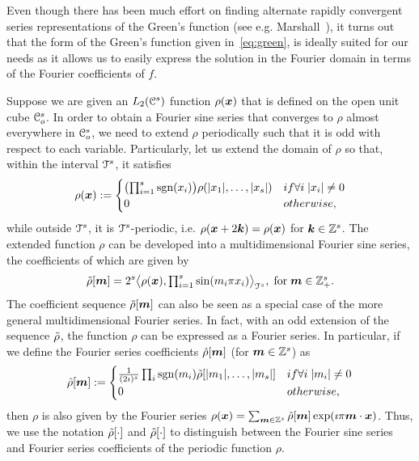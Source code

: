 Even though there has been much effort on finding alternate rapidly
convergent series representations of the Green's function (see
e.g. Marshall~\cite{marshall99}), it turns out that the form of the
Green's function given in~\eqref{eq:green}, is ideally suited
for our needs as it allows us to easily express the solution in the
Fourier domain in terms of the Fourier coefficients of $f$.

Suppose we are given an $L_2(\mathcal{C}^s)$ function $\rho(
\boldsymbol{x})$ that is
defined on the open unit cube $\mathcal{C}_o^s$. In order to obtain a
Fourier sine series that converges to $\rho$ almost everywhere in
$\mathcal{C}_o^s$, we need to extend $\rho$ periodically such that it is odd
with respect to each variable. Particularly, let us extend the domain
of $\rho$ so that, within the interval $\mathcal{T}^s$, it satisfies
\begin{equation}
  \small{
 \rho(\vect{x}) :=  
\begin{cases}
\bigl( \prod_{i=1}^s \sgn(x_i) \bigr)
\rho(|x_1|, \ldots, |x_s| ) &\mbox{if } \forall i \; |x_i| \ne 0 \\ 
0 &\mbox{otherwise},
\end{cases}
}
\label{eq:oddextension}
\end{equation}
while outside $\mathcal{T}^s$, it is $\mathcal{T}^s$-periodic, i.e. $\rho(\boldsymbol{x}
+ 2\boldsymbol{k}) = \rho(\boldsymbol{x})$ for $\boldsymbol{k} \in \mathbb{Z}^s$. The
extended function $\rho$ can be developed into a multidimensional
Fourier sine series, the coefficients of which are given by 
\begin{equation}
  \tilde{\rho}[\boldsymbol{m}] = 2^s \bigl \langle \rho(\boldsymbol{x}) , \textstyle{\prod_{i=1}^s}\sin(m_i\pi x_i) \bigr \rangle_{\mathcal{T}^s}, \; \text{for}\; \boldsymbol{m} \in \mathbb{Z}^s_+.
\end{equation}
The coefficient sequence $\tilde{\rho}[\boldsymbol{m}]$ can also be seen as a
special case of the more general multidimensional Fourier
series. In fact, with an odd extension of the sequence $\tilde{\rho}$, the
function $\rho$ can be expressed as a Fourier series. In particular,
if we define the Fourier series coefficients $\hat{\rho}[\boldsymbol{m}]$
(for $\boldsymbol{m} \in \mathbb{Z}^s$) as
\begin{equation}
  \small{
  \ft{\rho}[\vect{m}] := 
\begin{cases}
\frac{1}{(2\imath)^{s}} \prod_i \sgn(m_i)
\st{\rho}[|m_1|,\ldots,|m_s|] &\mbox{if } \forall i \; |m_i| \ne 0 \\
0 &\mbox{otherwise},
\end{cases}
}
\label{eq:oddFourierExtension}
\end{equation}
then  $\rho$ is also given by the Fourier series
$
  \rho(\boldsymbol{x}) = \sum_{\boldsymbol{m} \in
    \mathbb{Z}^s} \hat{\rho}[\boldsymbol{m}] 
\exp(\imath \pi \boldsymbol{m} \cdot \boldsymbol{x})
$.
Thus, we use the notation $\tilde{\rho}[\cdot]$ and $\hat{\rho}[\cdot]$ to
distinguish between the Fourier sine series and Fourier series
coefficients of the periodic function $\rho$.

